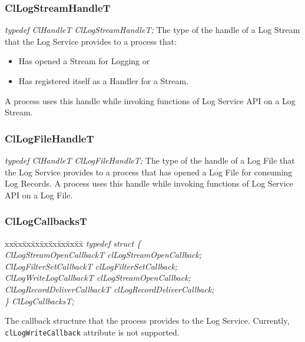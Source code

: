 \begin{flushleft}
\subsubsection{ClLogStreamHandleT}
\textit{typedef ClHandleT ClLogStreamHandleT;}
\newline
\newline
The type of the handle of a Log Stream that the Log Service provides to a process that:
\begin{itemize}
\item
Has opened a Stream for Logging or 
\item
Has registered itself as a Handler for a Stream. 
\end{itemize}
A process uses this handle while invoking functions of Log Service API on a Log Stream.


\subsubsection{ClLogFileHandleT}
\textit{typedef ClHandleT ClLogFileHandleT;}
\newline
\newline
The type of the handle of a Log File that the Log Service provides to a process that has opened a Log File for consuming Log Records.
A process uses this handle while invoking functions of Log Service API on a Log File.



\subsubsection{ClLogCallbacksT}
\begin{tabbing}
xx\=xx\=xx\=xx\=xx\=xx\=xx\=xx\=xx\=\kill
\textit{typedef struct \{}\\
\>\>\>\>\textit{ClLogStreamOpenCallbackT    clLogStreamOpenCallback;}\\
\>\>\>\>\textit{ClLogFilterSetCallbackT          clLogFilterSetCallback;}\\
\>\>\>\>\textit{ClLogWriteLogCallbackT         clLogStreamOpenCallback;}\\
\>\>\>\>\textit{ClLogRecordDeliverCallbackT	clLogRecordDeliverCallback;}\\
\textit{\} ClLogCallbacksT;}\end{tabbing}
The callback structure that the process provides to the Log Service. Currently, 
{\tt{clLogWriteCallback}} attribute is not supported. 



\end{flushleft}

